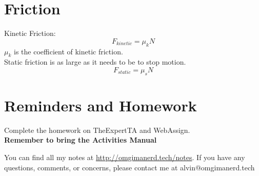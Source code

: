 \documentclass{math}
\begin{document}
\section*{Friction}
Kinetic Friction:
\[ F_{kinetic} = \mu_kN \]
\( \mu_k \) is the coefficient of kinetic friction. \\
Static friction is as large as it needs to be to stop motion.
\[ F_{static} = \mu_sN \]

\section*{Reminders and Homework}
Complete the homework on TheExpertTA and WebAssign. \\
\textbf{Remember to bring the Activities Manual}

\begin{center}
  You can find all my notes at \url{http://omgimanerd.tech/notes}. If you have
  any questions, comments, or concerns, please contact me at
  alvin@omgimanerd.tech
\end{center}
\end{document}
